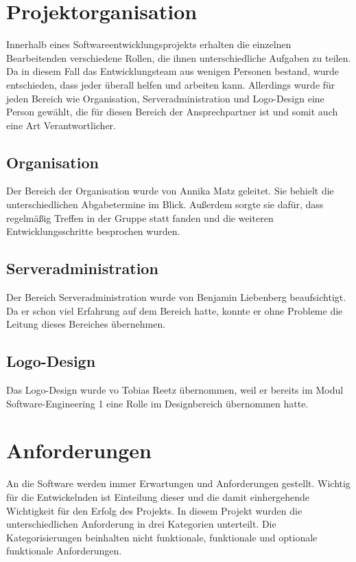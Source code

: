\documentclass[conference]{IEEEtran}
\begin{document}
\section{Projektorganisation}
Innerhalb eines Softwareentwicklungsprojekts erhalten die einzelnen Bearbeitenden verschiedene Rollen, die ihnen unterschiedliche Aufgaben zu teilen. Da in diesem Fall das Entwicklungsteam aus wenigen Personen bestand, wurde entschieden, dass jeder überall helfen und arbeiten kann. Allerdings wurde für jeden Bereich wie Organisation, Serveradministration und Logo-Design eine Person gewählt, die für diesen Bereich der Ansprechpartner ist und somit auch eine Art Verantwortlicher. 

\subsection{Organisation}
Der Bereich der Organisation wurde von Annika Matz geleitet. Sie behielt die unterschiedlichen Abgabetermine im Blick. Außerdem sorgte sie dafür, dass regelmäßig Treffen in der Gruppe statt fanden und die weiteren Entwicklungsschritte besprochen wurden.

\subsection{Serveradministration}
Der Bereich Serveradministration wurde von Benjamin Liebenberg beaufsichtigt. Da er schon viel Erfahrung auf dem Bereich hatte, konnte er ohne Probleme die Leitung dieses Bereiches übernehmen.

\subsection{Logo-Design}
Das Logo-Design wurde vo Tobias Reetz übernommen, weil er bereits im Modul Software-Engineering 1 eine Rolle im Designbereich übernommen hatte. 

\section{Anforderungen}
An die Software werden immer Erwartungen und Anforderungen gestellt. Wichtig für die Entwickelnden ist Einteilung dieser und die damit einhergehende Wichtigkeit für den Erfolg des Projekts. In diesem Projekt wurden die unterschiedlichen Anforderung in drei Kategorien unterteilt. Die Kategorisierungen beinhalten nicht funktionale, funktionale und optionale funktionale Anforderungen.
\end{document}

